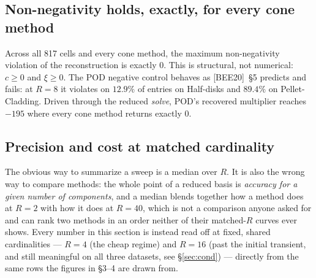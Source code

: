 \documentclass[11pt,a4paper]{article}
\newcommand{\bee}{\textsf{[BEE20]}}
\begin{document}
\subsection{Non-negativity holds, exactly, for every cone method}
Across all 817 cells and every cone method, the maximum non-negativity violation of the
reconstruction is exactly $0$. This is structural, not numerical: $c\ge0$ and $\xi\ge0$.
The POD negative control behaves as \bee{}~\S5 predicts and fails: at $R=8$ it violates on
$12.9\%$ of entries on Half-disks and $89.4\%$ on Pellet-Cladding. Driven through the
reduced \emph{solve}, POD's recovered multiplier reaches $-195$ where every cone method
returns exactly $0$.

\subsection{Precision and cost at matched cardinality}\label{sec:precost}

The obvious way to summarize a sweep is a median over $R$. It is also the wrong way to
compare methods: the whole point of a reduced basis is \emph{accuracy for a given number
of components}, and a median blends together how a method does at $R=2$ with how it does
at $R=40$, which is not a comparison anyone asked for and can rank two methods in an order
neither of their matched-$R$ curves ever shows. Every number in this section is instead
read off at fixed, shared cardinalities --- $R=4$ (the cheap regime) and $R=16$ (past the
initial transient, and still meaningful on all three datasets, see \S\ref{sec:cond}) ---
directly from the same rows the figures in \S3--4 are drawn from.
\end{document}
